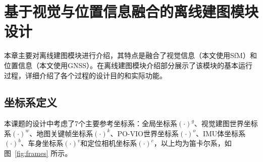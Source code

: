 
\chapter{基于视觉与位置信息融合的离线建图模块设计}

本章主要对离线建图模块进行介绍，其特点是融合了视觉信息（本文使用SfM）和位置信息（本文使用GNSS）。在离线建图模块介绍部分展示了该模块的基本运行过程，详细介绍了各个过程的设计目的和实际功能。

\section{坐标系定义}

本课题的设计中考虑了7个主要参考坐标系：全局坐标系$(\cdot)^{g}$、视觉建图世界坐标系$(\cdot)^{w}$、地图关键帧坐标系$(\cdot)^{k}$、PO-VIO世界坐标系$(\cdot)^{o}$、IMU体坐标系$(\cdot)^{b}$、车身坐标系$(\cdot)^{v}$和定位相机坐标系$(\cdot)^{c}$，以上均为笛卡尔系，如图~\ref{fig:frames} 所示。

